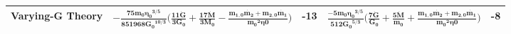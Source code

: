 \documentclass[11pt]{article}
\begin{document}
\begin{tabular}{ |p{1cm}|p{6.9cm}|p{0.4cm}|p{6cm}|p{0.3cm}|}
 \hline
 \vspace{20pt}
 \tiny Varying-G Theory&\rule{0pt}{4ex}\tiny $\bm{-\frac{75 m_0 {\eta_0}^{3/5}}{851968 {G_0}^{10/3}} \bigg(\frac{11 \dot{G}}{3 G_0} + \frac{17 \dot{M}}{3M_0}-\frac{m_{1,0}\dot{m_2}+m_{2,0}\dot{m_1}}{{m_0}^2 \eta0}\bigg)}$&\tiny-13&\tiny$\bm{\frac{-5 m_0 {\eta_0}^{3/5}}{512 {G_0}^{5/3}} \bigg(\frac{7 \dot{G}}{ G_0} + \frac{5\dot{M}}{m_0}+\frac{m_{1,0}\dot{m_2}+m_{2,0}\dot{m_1}}{{m_0}^2 \eta0}\bigg)}$&\tiny-8\\
\hline
\end{tabular}
 
 
 
 
 
 
 
\begin{comment}
\subsection{Disspative Correction Only}
\hspace{15.5pt}First we want to  derive ppE parameters considering only correction to the rate of change of binding energy i.e. correction to frequency evolution. We want to write $\dot{f}$ as
\begin{equation}\label{5}
\dot{f}=\dot{f}_{GR}(1+\gamma_{\dot{f}} u^{c_{\dot{f}}})
\end{equation}
where $\gamma_{\dot{f}}$ and $c_{\dot{f}}$ are ppE parameters. We want to relate $\gamma_{\dot{f}}$ and $c_{\dot{f}}$ to $\alpha$ and $a$. We also want to find a relation between $\alpha$ and $\beta$.\\
\hspace*{15.5pt}Gravitational waveform phase for the dominant harmonic in the Fourier domain satisfies the relation \cite{Tichy:1999pv}\cite{Stein:2013wza}
\begin{equation}\label{3}
\frac{d^2\Psi}{d\Omega^2}=2\frac{dt}{d\Omega}
\end{equation}
By using modfication in ppE phase from \eqref{eq:2} in left side of equation \eqref{3},
\begin{equation}\label{7}
\frac{d^2\delta\Psi}{d\Omega^2}=\frac{\beta b}{3}(\frac{b}{3}-1){\mathcal{M}}^2u^{b-6}
\end{equation}
In GR leading order term in orbital frequency evolution is given by \cite{Aubert:2006sb},
\begin{equation}\label{4}
\dot{F}_{GR}=\frac{48}{5\pi {\mathcal{M}}^2}u^{11}
\end{equation}
where $F=\frac{f}{2}$.\\

\end{comment}
\end{document}
